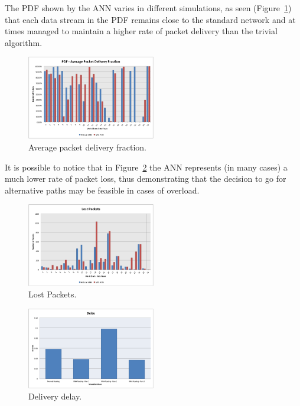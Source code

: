 \documentclass[10pt, conference, compsocconf]{IEEEtran}
\begin{document}
The PDF shown by the ANN varies in different simulations, as seen (Figure~\ref{fig:g11}) that each data stream in the PDF remains close to the standard network and at times managed to maintain a higher rate of packet delivery than the trivial algorithm.

\begin{figure}[h]
	\centering
	\includegraphics[width=0.5\textwidth]{./graphics/image011.png}
    \caption{ Average packet delivery fraction.}
    \label{fig:g11}
\end{figure}

It is possible to notice that in Figure~\ref{fig:g12} the ANN represents (in many cases) a much lower rate of packet loss, thus demonstrating that the decision to go for alternative paths may be feasible in cases of overload.

\begin{figure}[h]
	\centering
	\includegraphics[width=0.5\textwidth]{./graphics/image012.png}
    \caption{ Lost Packets.}
    \label{fig:g12}
\end{figure}

\begin{figure}[h]
	\centering
	\includegraphics[width=0.5\textwidth]{./graphics/image013.png}
    \caption{ Delivery delay.}
    \label{fig:g13}
\end{figure}
\end{document}

